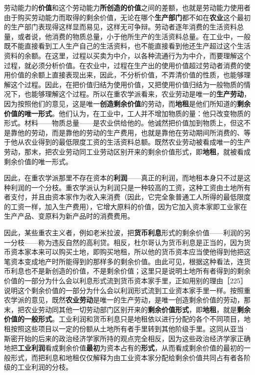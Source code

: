 劳动能力的\textbf{价值}和这个劳动能力\textbf{所创造的价值}之间的差额，也就是劳动能力使用者由于购买劳动能力而取得的剩余价值，无论在哪个\textbf{生产部门}都不如在\textbf{农业}这个最初的生产部门表现得这样显而易见，这样无可争辩。劳动者逐年消费的生活资料总量，或者说，他消费的物质总量，小于他所生产的生活资料总量。在工业中，一般既不能直接看到工人生产自己的生活资料，也不能直接看到他还生产超过这个生活资料的余额。在这里，过程以买卖为中介，以各种流通行为为中介，而要理解这个过程，就必须分析价值。在农业中，过程在生产出的使用价值超过劳动者消费的使用价值的余额上直接表现出来，因此，不分析价值，不弄清价值的性质，也能够理解这个过程。因此，在把价值归结为使用价值，又把使用价值归结为一般物质的情况下，也能够理解这个过程。所以在重农学派看来，农业劳动是唯一的\textbf{生产劳动}，因为按照他们的意见，这是唯一\textbf{创造剩余价值}的劳动，而\textbf{地租}是他们所知道的\textbf{剩余价值的唯一形式}。他们认为，在工业中，工人并不增加物质的量：他只改变物质的形式。材料——物质总量——是农业供给他的。他诚然把价值加到物质上，但这不是靠他的劳动，而是靠他的劳动的生产费用，也就是靠他在劳动期间所消费的、等于他从农业得到的最低限度工资的生活资料总额。既然农业劳动被看成唯一的生产劳动，那末，把农业劳动同工业劳动区别开来的剩余价值形式，即\textbf{地租}，就被看成剩余价值的唯一形式。

因此，在重农学派那里不存在资本的\textbf{利润}——真正的利润，而地租本身只不过是这种利润的一个分枝。重农学派认为利润只是一种较高的工资，这种工资由土地所有者支付，并且由资本家作为收入来消费（因此，它完全象普通工人所得的最低限度的工资一样，加入生产费用），它增大原料的价值，因为它加入资本家即工业家在生产产品、变原料为新产品时的消费费用。

因此，某些重农主义者，例如老米拉波，把\textbf{货币利息}形式的剩余价值——利润的另一分枝——称为违反自然的高利贷。相反，杜尔哥认为货币利息是正当的，因为货币资本家本来可以购买土地，即购买地租，所以他的货币资本应当使他得到他把这笔资本变成地产时所能得到的那样多的剩余价值。由此可见，根据这种看法，连货币利息也不是新创造的价值，不是剩余价值；这里只是说明土地所有者得到的剩余价值的一部分为什么会以利息形式流到货币资本家手里，正如用别的理由［225］说明这个剩余价值的一部分为什么会以利润形式流到工业资本家手里一样。按照重农学派的意见，既然\textbf{农业劳动}是唯一的生产劳动，是唯一创造剩余价值的劳动，那末，把农业劳动同其他一切劳动部门区别开来的\textbf{剩余价值形式}，即\textbf{地租}，就是\textbf{剩余价值的一般形式}。工业利润和货币利息只是地租依以进行分配的各个不同项目，地租按照这些项目以一定的份额从土地所有者手里转到其他阶级手里。这同从亚当·斯密开始的后来的政治经济学家所持的观点完全相反，因为这些政治经济学家正确地把\textbf{工业利润}看成剩余价值\textbf{最初}为资本占有的\textbf{形式}，从而看成剩余价值的最初的一般形式，而把利息和地租仅仅解释为由工业资本家分配给剩余价值共同占有者各阶级的工业利润的分枝。

